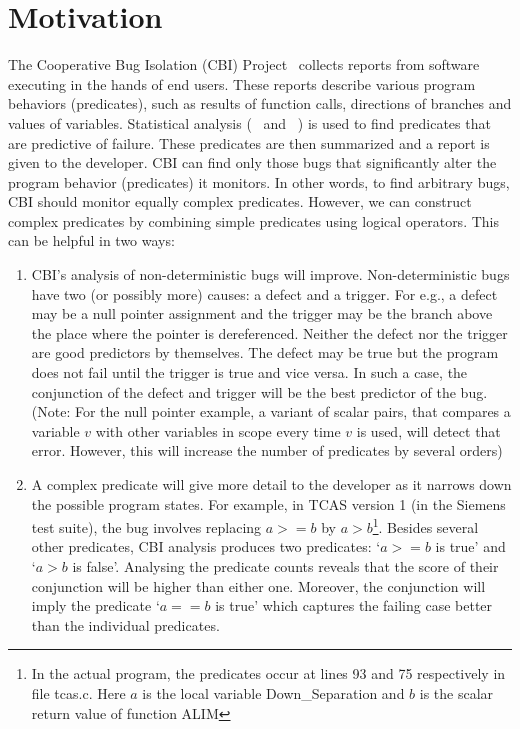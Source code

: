 \section{Motivation}

The Cooperative Bug Isolation (CBI) Project~\cite{Liblit:2004:CBI} collects reports from software executing in the hands of end users.  These reports describe various program behaviors (predicates), such as results of function calls, directions of branches and values of variables.  Statistical analysis (~\cite{Liblit:2005:SSBI} and ~\cite{Zheng:2006:SDSIMB}) is used to find predicates that are predictive of failure.  These predicates are then summarized and a report is given to the developer.  CBI can find only those bugs that significantly alter the program behavior (predicates) it monitors.  In other words, to find arbitrary bugs, CBI should monitor equally complex predicates.  However, we can construct complex predicates by combining simple predicates using logical operators.  This can be helpful in two ways:
\begin{enumerate}
\item CBI's analysis of non-deterministic bugs will improve.  Non-deterministic bugs have two (or possibly more) causes: a defect and a trigger.  For e.g., a defect may be a null pointer assignment and the trigger may be the branch above the place where the pointer is dereferenced.  Neither the defect nor the trigger are good predictors by themselves.  The defect may be true but the program does not fail until the trigger is true and vice versa.  In such a case, the conjunction of the defect and trigger will be the best predictor of the bug.  (Note: For the null pointer example, a variant of scalar pairs, that compares a variable $v$ with other variables in scope every time $v$ is used, will detect that error.  However, this will increase the number of predicates by several orders)

\item A complex predicate will give more detail to the developer as it narrows down the possible program states.  For example, in TCAS version 1 (in the Siemens test suite), the bug involves replacing $a >= b$ by $a > b$\footnote{In the actual program, the predicates occur at lines 93 and 75 respectively in file tcas.c.  Here $a$ is the local variable Down\_Separation and $b$ is the scalar return value of function ALIM}.  Besides several other predicates, CBI analysis produces two predicates: `$a >= b$ is true' and `$a > b$ is false'.  Analysing the predicate counts reveals that the score of their conjunction will be higher than either one.  Moreover, the conjunction will imply the predicate `$a==b$ is true' which captures the failing case better than the individual predicates.
\end{enumerate}

